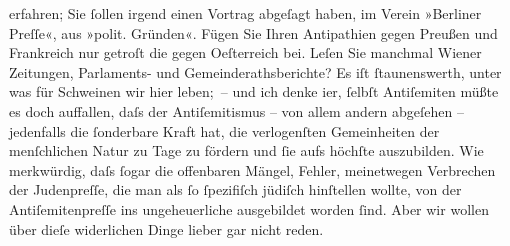                erfahren; Sie{ }ſollen irgend einen Vortrag abgeſagt haben, im Verein »Berliner Preſſe«, aus »polit. Gründen«. Fügen Sie
               Ihren Antipathien gegen Preußen und Frankreich nur getroſt \introOben{}die\introOben{} gegen Oeſterreich bei. Leſen Sie manchmal Wiener Zeitungen, Parlaments- und
               Gemeinderathsberichte? Es iſt{ }ſtaunenswerth, unter was für Schweinen wir hier
               leben; – und {\pb}ich denke i{\geminationm}er,{ }ſelbſt Antiſemiten müßte es doch auffallen, daſs
               der Antiſemitismus – von allem andern abgeſehen – jedenfalls die{ }ſonderbare Kraft
               hat, die verlogenſten Gemeinheiten der menſchlichen Natur zu Tage zu fördern und{ }ſie
               aufs höchſte auszubilden. Wie merkwürdig, daſs{ }ſogar die offenbaren Mängel, Fehler,
               meinetwegen Verbrechen der Judenpreſſe, die man als{ }ſo{ }ſpezifiſch jüdiſch hinſtellen
               wollte, von der Antiſemiten{\pb}preſſe ins
               ungeheuerliche ausgebildet worden{ }ſind. Aber wir wollen über dieſe widerlichen Dinge
               lieber gar nicht reden.\pend
           
